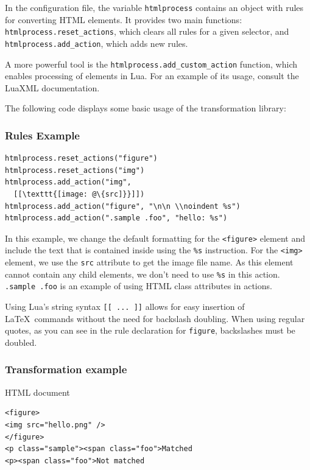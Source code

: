 In the configuration file, the variable \texttt{htmlprocess} contains an object with
rules for converting HTML elements. It provides two main functions:
\texttt{htmlprocess.reset\_actions}, which clears all rules for a given selector, and
\texttt{htmlprocess.add\_action}, which adds new rules.

A more powerful tool is the \verb|htmlprocess.add_custom_action| function, which
enables processing of elements in Lua. For an example of its usage, consult the
LuaXML documentation.

The following code displays some basic usage of the transformation library:

\begin{frame}[fragile]
  \frametitle{Rules Example}

\begin{verbatim}
htmlprocess.reset_actions("figure")
htmlprocess.reset_actions("img")
htmlprocess.add_action("img",
  [[\texttt{[image: @\{src]}}]])
htmlprocess.add_action("figure", "\n\n \\noindent %s")
htmlprocess.add_action(".sample .foo", "hello: %s")
\end{verbatim}
\end{frame}

In this example, we change the default formatting for the \verb|<figure>| element and include the 
text that is contained inside using the \verb|%s| instruction. For the \verb|<img>| element, we use 
the \verb|src| attribute to get the image file name. As this element cannot contain any child elements,
we don't need to use \verb|%s| in this action. \verb|.sample .foo| is an example of using HTML class 
attributes in actions.

Using Lua's string syntax \verb|[[ ... ]]| allows for easy insertion of \LaTeX\
commands without the need for backslash doubling. When using regular quotes, as
you can see in the rule declaration for \verb|figure|, backslashes must be
doubled.

\begin{frame}[fragile]
  \frametitle{Transformation example}
  \begin{example}{HTML document}
     \begin{verbatim}
<figure>
<img src="hello.png" />
</figure>
<p class="sample"><span class="foo">Matched
<p><span class="foo">Not matched
     \end{verbatim}
  \end{example}
\end{frame}


